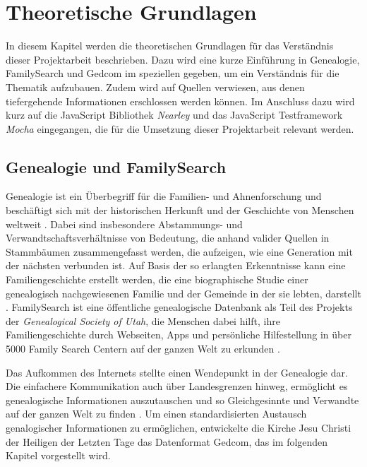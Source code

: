 \chapter{Theoretische Grundlagen}
\label{chap: Theoretische Grundlagen}
In diesem Kapitel werden die theoretischen Grundlagen für das Verständnis dieser Projektarbeit beschrieben. Dazu wird eine kurze Einführung in Genealogie, FamilySearch und Gedcom im speziellen gegeben, um ein Verständnis für die Thematik aufzubauen. Zudem wird auf Quellen verwiesen, aus denen tiefergehende Informationen erschlossen werden können. Im Anschluss dazu wird kurz auf die JavaScript Bibliothek \textit{Nearley} und das JavaScript Testframework \textit{Mocha} eingegangen, die für die Umsetzung dieser Projektarbeit relevant werden.

\section{Genealogie und FamilySearch}
\label{sec: Genealogie und FamilySearch}
Genealogie ist ein Überbegriff für die Familien- und Ahnenforschung und beschäftigt sich mit der historischen Herkunft und der Geschichte von Menschen weltweit \cite{AhnenforschungDE}. Dabei sind insbesondere Abstammungs- und Verwandtschaftsverhältnisse von Bedeutung, die anhand valider Quellen in Stammbäumen zusammengefasst werden, die aufzeigen, wie eine Generation mit der nächsten verbunden ist. Auf Basis der so erlangten Erkenntnisse kann eine Familiengeschichte erstellt werden, die eine biographische Studie einer genealogisch nachgewiesenen Familie und der Gemeinde in der sie lebten, darstellt \cite{SocietyOfGenealogists}. FamilySearch ist eine öffentliche genealogische Datenbank als Teil des Projekts der \textit{Genealogical Society of Utah}, die Menschen dabei hilft, ihre Familiengeschichte durch Webseiten, Apps und persönliche Hilfestellung in über 5000 Family Search Centern auf der ganzen Welt zu erkunden \cite{FamilySearchAbout}.

Das Aufkommen des Internets stellte einen Wendepunkt in der Genealogie dar. Die einfachere Kommunikation auch über Landesgrenzen hinweg, ermöglicht es genealogische Informationen auszutauschen und so Gleichgesinnte und Verwandte auf der ganzen Welt zu finden \cite{AhnenforschungDE}. Um einen standardisierten Austausch genalogischer Informationen zu ermöglichen, entwickelte die Kirche Jesu Christi der Heiligen der Letzten Tage das Datenformat Gedcom, das im folgenden Kapitel vorgestellt wird.
\newpage
